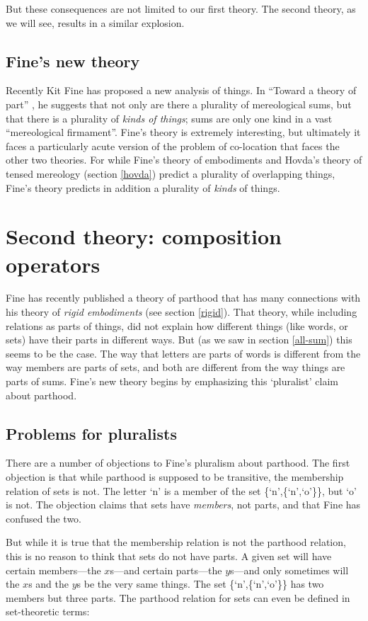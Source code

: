 \documentclass[11pt]{article}
\begin{document}
\begin{spacing}{1.5}
But these consequences are not limited to our first theory.  The
second theory, as we will see, results in a similar explosion.

\subsection{Fine's new theory}
\label{new-old}
Recently Kit Fine has proposed a new analysis of things.  In ``Toward
a theory of part'' \citeyearpar{fine2010}, he suggests that not only
are there a plurality of mereological sums, but that there is a
plurality of {\em kinds of things}; sums are only one kind in a vast
``mereological firmament''.  Fine's theory is extremely interesting,
but ultimately it faces a particularly acute version of the problem of
co-location that faces the other two theories.  For while Fine's
theory of embodiments and Hovda's theory of tensed mereology (section
\ref{hovda}) predict a plurality of overlapping things, Fine's theory
predicts in addition a plurality of {\em kinds} of things.

\section{Second theory: composition operators}
\label{fine-c}
Fine has recently published a theory of parthood that has many
connections with his theory of {\em rigid embodiments} (see section
\ref{rigid}).  That theory, while including relations as parts of
things, did not explain how different things (like words, or sets)
have their parts in different ways.  But (as we saw in section
\ref{all-sum}) this seems to be the case.  The way that letters are
parts of words is different from the way members are parts of sets,
and both are different from the way things are parts of sums.  Fine's
new theory begins by emphasizing this `pluralist' claim about
parthood.

\subsection{Problems for pluralists}
\label{sets}
There are a number of objections to Fine's pluralism about parthood.
The first objection is that while parthood is supposed to be
transitive, the membership relation of sets is not.  The letter `n' is
a member of the set \{`n',\{`n',`o'\}\}, but `o' is not.  The
objection claims that sets have {\em members}, not parts, and that
Fine has confused the two.

But while it is true that the membership relation is not the parthood
relation, this is no reason to think that sets do not have parts.  A
given set will have certain members---the $x$s---and certain
parts---the $y$s---and only sometimes will the $x$s and the $y$s be
the very same things.  The set \{`n',\{`n',`o'\}\} has two members
but three parts.  The parthood relation for sets can even be defined
in set-theoretic terms:


\end{spacing}
\end{document}
